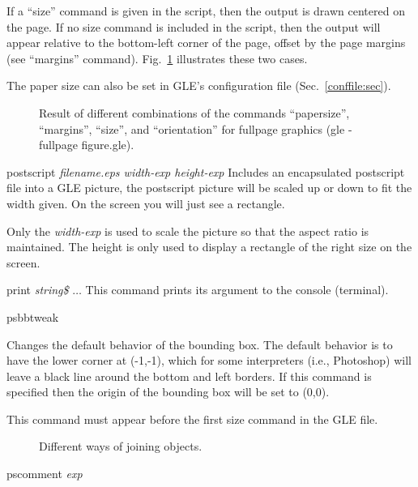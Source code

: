 \begin{commanddescription}
If a ``size'' command is given in the script, then the output is drawn centered on the page. If no size command is included in the script, then the output will appear relative to the bottom-left corner of the page, offset by the page margins (see ``margins'' command). Fig.~\ref{fullpage:fig} illustrates these two cases.

The paper size can also be set in GLE's configuration file (Sec.~\ref{conffile:sec}).

\begin{figure}[tb]
\centering
\mbox{}
\caption{\label{fullpage:fig}Result of different combinations of the commands ``papersize'', ``margins'', ``size'', and ``orientation'' for fullpage graphics (gle -fullpage figure.gle).}
\end{figure}

\item[{\sf postscript {\it filename.eps  width-exp height-exp}} ]
 Includes an encapsulated postscript file into a
GLE picture, the postscript picture will be scaled up or down to fit
the width given.  On the screen you will just see a rectangle.

Only the {\it width-exp} is used to scale the picture so that the
aspect ratio is maintained. The
height is only used to display a rectangle of the right size on the screen.

\item[{\sf print {\it string\$} $\ldots$}]
 This command prints its argument to the console (terminal).

\item[{\sf psbbtweak}]

Changes the default behavior of the bounding box.  The default behavior is to have the lower corner at (-1,-1), which for some interpreters (i.e., Photoshop) will leave a black line around the bottom and left borders.  If this command is specified then the origin of the bounding box will be set to (0,0).

This command must appear before the first {\sf size} command in the GLE file.

\begin{figure}
\centering
\mbox{}
\caption{\label{joicur:fig}Different ways of joining objects.}
\end{figure}

\item[{\sf pscomment} {\it exp}]


\end{commanddescription}
